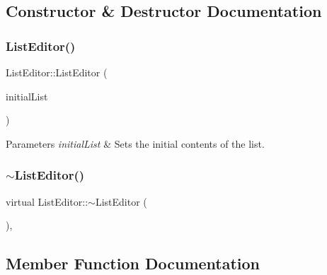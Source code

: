 \subsection{Constructor \& Destructor Documentation}
\mbox{\label{classListEditor_a3a5192ee7c78ecc19d9f1b9e21cf5285}} 
\subsubsection{\texorpdfstring{List\+Editor()}{ListEditor()}}
{\footnotesize\ttfamily List\+Editor\+::\+List\+Editor (\begin{DoxyParamCaption}\item[{String\+Array}]{initial\+List }\end{DoxyParamCaption})}


\begin{DoxyParams}{Parameters}
{\em initial\+List} & Sets the initial contents of the list. \\
\hline
\end{DoxyParams}
\mbox{\label{classListEditor_ae1d17155182eebb4b4e912d10d32bf61}} 
\subsubsection{\texorpdfstring{$\sim$\+List\+Editor()}{~ListEditor()}}
{\footnotesize\ttfamily virtual List\+Editor\+::$\sim$\+List\+Editor (\begin{DoxyParamCaption}{ }\end{DoxyParamCaption})\hspace{0.3cm}{\ttfamily [inline]}, {\ttfamily [virtual]}}



\subsection{Member Function Documentation}
\mbox{\label{classListEditor_a901d86cfa2ce035d1d57fe6af5a9200a}} 
